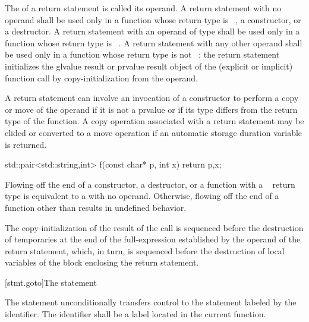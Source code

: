\pnum
The 
of a return statement is called its operand. A return statement with
no operand shall be used only in a function whose return type is
\cv{}~, a constructor, or a
destructor.
%
%
A return statement with an operand of type  shall be used only
in a function whose return type is \cv{}~.
A return statement with any other operand shall be used only
in a function whose return type is not \cv{}~;
%
the return statement initializes the
glvalue result or prvalue result object of the (explicit or implicit) function call
by copy-initialization from the operand.
\begin{note}
A return statement can involve
an invocation of a constructor to perform a copy or move of the operand
if it is not a prvalue or if its type differs from the return type of the function.
A copy operation associated with a return statement may be elided or
converted to a move operation if an automatic storage duration variable is returned.
\end{note}
\begin{example}
\begin{codeblock}
std::pair<std::string,int> f(const char* p, int x) {
  return {p,x};
}
\end{codeblock}
\end{example}
Flowing off the end of
a constructor,
a destructor, or
a function with a \cv{}~ return type is
equivalent to a  with no operand.
Otherwise, flowing off the end of a function
other than 
results in undefined behavior.

\pnum
The copy-initialization of the result of the call is sequenced before the
destruction of temporaries at the end of the full-expression established
by the operand of the return statement, which, in turn, is sequenced
before the destruction of local variables of the block
enclosing the return statement.

[stmt.goto]{The  statement}%

\pnum
The  statement unconditionally transfers control to the
statement labeled by the identifier. The identifier shall be a
%
label located in the current function.

